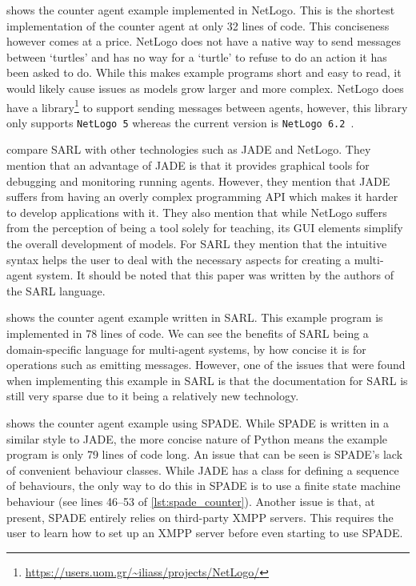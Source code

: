  shows the counter agent example implemented in NetLogo.
This is the shortest implementation of the counter agent at only 32 lines of code.
This conciseness however comes at a price.
NetLogo does not have a native way to send messages between `turtles' and has no way for a `turtle' to refuse to do an action it has been asked to do.
While this makes example programs short and easy to read, it would likely cause issues as models grow larger and more complex.
NetLogo does have a library\footnote{\url{https://users.uom.gr/~iliass/projects/NetLogo/}} to support sending messages between agents, however, this library only supports \verb|NetLogo 5| whereas the current version is \verb|NetLogo 6.2|~\cite{sakellariou2008enhancing}.

 compare SARL with other technologies such as JADE and NetLogo.
They mention that an advantage of JADE is that it provides graphical tools for debugging and monitoring running agents.
However, they mention that JADE suffers from having an overly complex programming API which makes it harder to develop applications with it.
They also mention that while NetLogo suffers from the perception of being a tool solely for teaching, its GUI elements simplify the overall development of models.
For SARL they mention that the intuitive syntax helps the user to deal with the necessary aspects for creating a multi-agent system.
It should be noted that this paper was written by the authors of the SARL language.

 shows the counter agent example written in SARL\@.
This example program is implemented in 78 lines of code.
We can see the benefits of SARL being a domain-specific language for multi-agent systems, by how concise it is for operations such as emitting messages.
However, one of the issues that were found when implementing this example in SARL is that the documentation for SARL is still very sparse due to it being a relatively new technology.

 shows the counter agent example using SPADE\@.
While SPADE is written in a similar style to JADE, the more concise nature of Python means the example program is only 79 lines of code long.
An issue that can be seen is SPADE's lack of convenient behaviour classes.
While JADE has a class for defining a sequence of behaviours, the only way to do this in SPADE is to use a finite state machine behaviour (see lines 46--53 of \cref{lst:spade_counter}).
Another issue is that, at present, SPADE entirely relies on third-party XMPP servers.
This requires the user to learn how to set up an XMPP server before even starting to use SPADE\@.

